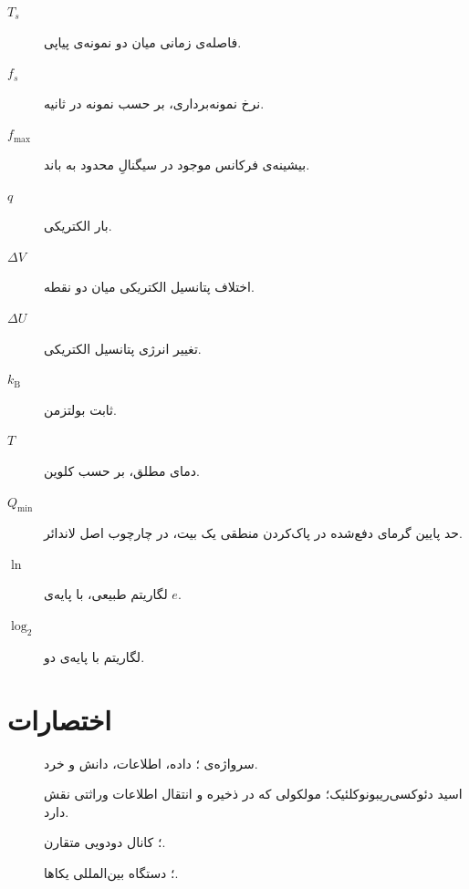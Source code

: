 \begin{description}
  \item[\(T_s\)] فاصله‌ی زمانی میان دو نمونه‌ی پیاپی.
  \item[\(f_s\)] نرخ نمونه‌برداری، بر حسب نمونه در ثانیه.
  \item[\(f_{\max}\)] بیشینه‌ی فرکانس موجود در سیگنالِ محدود به باند.
  \item[\(q\)] بار الکتریکی.
  \item[\(\Delta V\)] اختلاف پتانسیل الکتریکی میان دو نقطه.
  \item[\(\Delta U\)] تغییر انرژی پتانسیل الکتریکی.
  \item[\(k_{\mathrm B}\)] ثابت بولتزمن.
  \item[\(T\)] دمای مطلق، بر حسب کلوین.
  \item[\(Q_{\min}\)] حد پایین گرمای دفع‌شده در پاک‌کردن منطقی یک بیت، در چارچوب اصل لاندائر.
  \item[\(\ln\)] لگاریتم طبیعی، با پایه‌ی \(e\).
  \item[\(\log_2\)] لگاریتم با پایه‌ی دو.
\end{description}

\section*{اختصارات}

\begin{description}
  \item[] سرواژه‌ی ؛ داده، اطلاعات، دانش و خرد.
  \item[] اسید دئوکسی‌ریبونوکلئیک؛ مولکولی که در ذخیره و انتقال اطلاعات وراثتی نقش دارد.
  \item[] ؛ کانال دودویی متقارن.
  \item[] ؛ دستگاه بین‌المللی یکاها.
\end{description}
